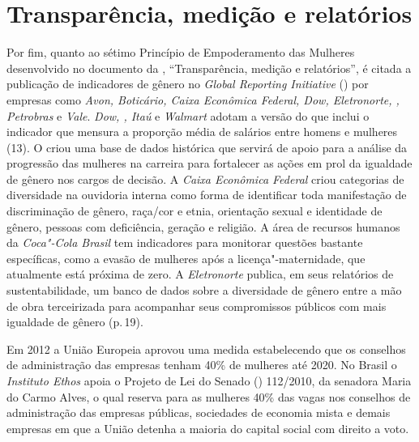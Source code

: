 \section{Transparência, medição e relatórios}

Por fim, quanto ao sétimo Princípio de Empoderamento das Mulheres
desenvolvido no documento da , ``Transparência, medição e
relatórios'', é citada a publicação de
indicadores de gênero no \emph{Global Reporting Initiative} () por
empresas como \emph{Avon, Boticário, Caixa Econômica Federal, Dow,
Eletronorte, , Petrobras} e \emph{Vale}. \emph{Dow, , Itaú} e
\emph{Walmart} adotam a versão do  que inclui o indicador que mensura
a proporção média de salários entre homens e mulheres (13). O
\emph{} criou uma base de dados histórica que servirá de apoio para
a análise da progressão das mulheres na carreira para fortalecer as
ações em prol da igualdade de gênero nos cargos de decisão. A
\emph{Caixa Econômica Federal} criou categorias de diversidade na
ouvidoria interna como forma de identificar toda manifestação de
discriminação de gênero, raça/cor e etnia, orientação sexual e
identidade de gênero, pessoas com deficiência, geração e religião. A
área de recursos humanos da \emph{Coca"-Cola Brasil} tem indicadores para
monitorar questões bastante específicas, como a evasão de mulheres após
a licença"-maternidade, que atualmente está próxima de zero. A
\emph{Eletronorte} publica, em seus relatórios de sustentabilidade, um
banco de dados sobre a diversidade de gênero entre a mão de obra
terceirizada para acompanhar seus compromissos públicos com mais
igualdade de gênero (p.\,19).

Em 2012 a União Europeia aprovou uma medida estabelecendo que os
conselhos de administração das empresas tenham 40\% de mulheres até
2020. No Brasil o \emph{Instituto Ethos} apoia o Projeto de Lei do
Senado () 112/2010, da senadora Maria do Carmo Alves, o qual reserva
para as mulheres 40\% das vagas nos conselhos de administração das
empresas públicas, sociedades de economia mista e demais empresas em que
a União detenha a maioria do capital social com direito a voto.

